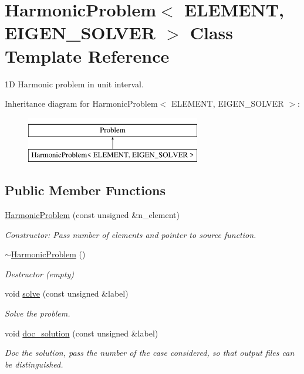 \hypertarget{classHarmonicProblem}{}\section{Harmonic\+Problem$<$ E\+L\+E\+M\+E\+NT, E\+I\+G\+E\+N\+\_\+\+S\+O\+L\+V\+ER $>$ Class Template Reference}
\label{classHarmonicProblem}


1D Harmonic problem in unit interval.  


Inheritance diagram for Harmonic\+Problem$<$ E\+L\+E\+M\+E\+NT, E\+I\+G\+E\+N\+\_\+\+S\+O\+L\+V\+ER $>$\+:\begin{figure}[H]
\begin{center}
\leavevmode
\includegraphics[height=2.000000cm]{classHarmonicProblem}
\end{center}
\end{figure}
\subsection*{Public Member Functions}
\begin{DoxyCompactItemize}
\item 
\hyperlink{classHarmonicProblem_a77a25847f00ae50c83218530149e3e57}{Harmonic\+Problem} (const unsigned \&n\+\_\+element)
\begin{DoxyCompactList}\small\item\em Constructor\+: Pass number of elements and pointer to source function. \end{DoxyCompactList}\item 
\hyperlink{classHarmonicProblem_a929be27d0bb040eef28336b2145b5a59}{$\sim$\+Harmonic\+Problem} ()
\begin{DoxyCompactList}\small\item\em Destructor (empty) \end{DoxyCompactList}\item 
void \hyperlink{classHarmonicProblem_aba2b3fd58a67f03ca0481e426d385c5d}{solve} (const unsigned \&label)
\begin{DoxyCompactList}\small\item\em Solve the problem. \end{DoxyCompactList}\item 
void \hyperlink{classHarmonicProblem_a95e94f87cf4f63e332c09bd9f1bbae7c}{doc\+\_\+solution} (const unsigned \&label)
\begin{DoxyCompactList}\small\item\em Doc the solution, pass the number of the case considered, so that output files can be distinguished. \end{DoxyCompactList}\end{DoxyCompactItemize}


